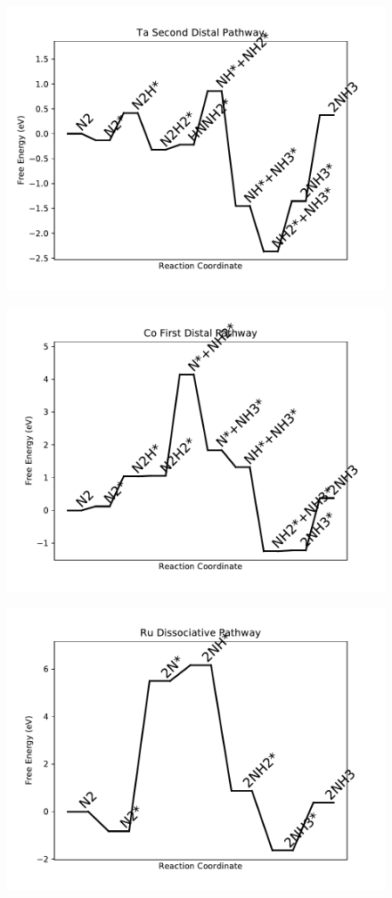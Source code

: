 \begin{figure}
\centering
\includegraphics[width=0.8\linewidth]{data/plots/Ta_distal_2.pdf}
\end{figure}

\begin{figure}
\centering
\includegraphics[width=0.8\linewidth]{data/plots/Co_distal_1.pdf}
\end{figure}

\begin{figure}
\centering
\includegraphics[width=0.8\linewidth]{data/plots/Ru_dissociative.pdf}
\end{figure}

